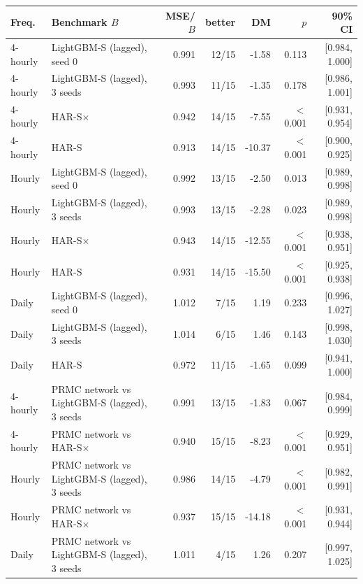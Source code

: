 \begin{tabular}{llrrrrr}
\toprule
Freq. & Benchmark $B$ & MSE/$B$ & better & DM & $p$ & 90\% CI \\
\midrule
4-hourly & LightGBM-S (lagged), seed 0 & 0.991 & 12/15 & -1.58 & 0.113 & [0.984, 1.000] \\
4-hourly & LightGBM-S (lagged), 3 seeds & 0.993 & 11/15 & -1.35 & 0.178 & [0.986, 1.001] \\
4-hourly & HAR-S$\times$ & 0.942 & 14/15 & -7.55 & $<$0.001 & [0.931, 0.954] \\
4-hourly & HAR-S & 0.913 & 14/15 & -10.37 & $<$0.001 & [0.900, 0.925] \\
Hourly & LightGBM-S (lagged), seed 0 & 0.992 & 13/15 & -2.50 & 0.013 & [0.989, 0.998] \\
Hourly & LightGBM-S (lagged), 3 seeds & 0.993 & 13/15 & -2.28 & 0.023 & [0.989, 0.998] \\
Hourly & HAR-S$\times$ & 0.943 & 14/15 & -12.55 & $<$0.001 & [0.938, 0.951] \\
Hourly & HAR-S & 0.931 & 14/15 & -15.50 & $<$0.001 & [0.925, 0.938] \\
Daily & LightGBM-S (lagged), seed 0 & 1.012 & 7/15 & 1.19 & 0.233 & [0.996, 1.027] \\
Daily & LightGBM-S (lagged), 3 seeds & 1.014 & 6/15 & 1.46 & 0.143 & [0.998, 1.030] \\
Daily & HAR-S & 0.972 & 11/15 & -1.65 & 0.099 & [0.941, 1.000] \\
\midrule
4-hourly & PRMC network vs LightGBM-S (lagged), 3 seeds & 0.991 & 13/15 & -1.83 & 0.067 & [0.984, 0.999] \\
4-hourly & PRMC network vs HAR-S$\times$ & 0.940 & 15/15 & -8.23 & $<$0.001 & [0.929, 0.951] \\
Hourly & PRMC network vs LightGBM-S (lagged), 3 seeds & 0.986 & 14/15 & -4.79 & $<$0.001 & [0.982, 0.991] \\
Hourly & PRMC network vs HAR-S$\times$ & 0.937 & 15/15 & -14.18 & $<$0.001 & [0.931, 0.944] \\
Daily & PRMC network vs LightGBM-S (lagged), 3 seeds & 1.011 & 4/15 & 1.26 & 0.207 & [0.997, 1.025] \\
\bottomrule
\end{tabular}
